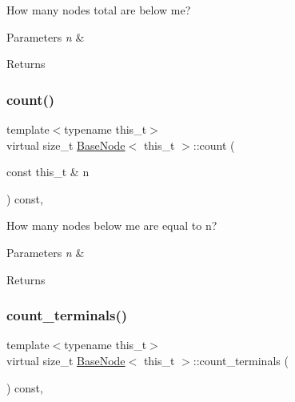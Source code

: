 How many nodes total are below me? 
\begin{DoxyParams}{Parameters}
{\em n} & \\
\hline
\end{DoxyParams}
\begin{DoxyReturn}{Returns}

\end{DoxyReturn}
\mbox{\label{class_base_node_aaaf113bd98ee404e71582ac1cf014ac0}} 
\subsubsection{\texorpdfstring{count()}{count()}\hspace{0.1cm}{\footnotesize\ttfamily [2/2]}}
{\footnotesize\ttfamily template$<$typename this\+\_\+t$>$ \\
virtual size\+\_\+t \hyperlink{class_base_node}{Base\+Node}$<$ this\+\_\+t $>$\+::count (\begin{DoxyParamCaption}\item[{const this\+\_\+t \&}]{n }\end{DoxyParamCaption}) const\hspace{0.3cm}{\ttfamily [inline]}, {\ttfamily [virtual]}}

How many nodes below me are equal to n? 
\begin{DoxyParams}{Parameters}
{\em n} & \\
\hline
\end{DoxyParams}
\begin{DoxyReturn}{Returns}

\end{DoxyReturn}
\mbox{\label{class_base_node_adb6326eefe4ddc311651b4a4a5cb119e}} 
\subsubsection{\texorpdfstring{count\+\_\+terminals()}{count\_terminals()}}
{\footnotesize\ttfamily template$<$typename this\+\_\+t$>$ \\
virtual size\+\_\+t \hyperlink{class_base_node}{Base\+Node}$<$ this\+\_\+t $>$\+::count\+\_\+terminals (\begin{DoxyParamCaption}{ }\end{DoxyParamCaption}) const\hspace{0.3cm}{\ttfamily [inline]}, {\ttfamily [virtual]}}

